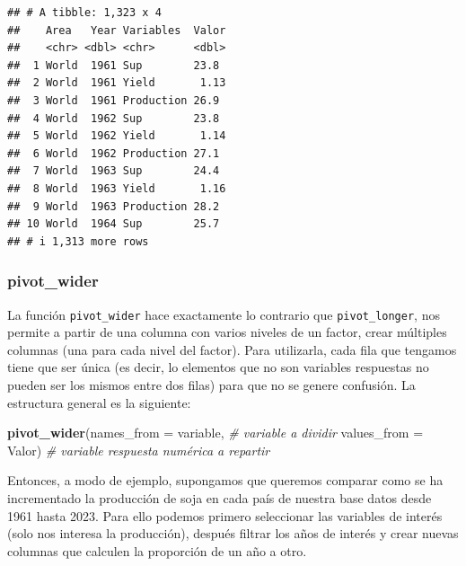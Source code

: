 \documentclass[
]{article}
\newenvironment{Shaded}{\begin{snugshade}}{\end{snugshade}}
\newcommand{\AttributeTok}[1]{\textcolor[rgb]{0.13,0.29,0.53}{#1}}
\newcommand{\CommentTok}[1]{\textcolor[rgb]{0.56,0.35,0.01}{\textit{#1}}}
\newcommand{\FunctionTok}[1]{\textcolor[rgb]{0.13,0.29,0.53}{\textbf{#1}}}
\newcommand{\NormalTok}[1]{#1}
\begin{document}
\begin{verbatim}
## # A tibble: 1,323 x 4
##    Area   Year Variables  Valor
##    <chr> <dbl> <chr>      <dbl>
##  1 World  1961 Sup        23.8 
##  2 World  1961 Yield       1.13
##  3 World  1961 Production 26.9 
##  4 World  1962 Sup        23.8 
##  5 World  1962 Yield       1.14
##  6 World  1962 Production 27.1 
##  7 World  1963 Sup        24.4 
##  8 World  1963 Yield       1.16
##  9 World  1963 Production 28.2 
## 10 World  1964 Sup        25.7 
## # i 1,313 more rows
\end{verbatim}

\subsubsection{pivot\_wider}\label{pivot_wider}

La función \texttt{pivot\_wider} hace exactamente lo contrario que
\texttt{pivot\_longer}, nos permite a partir de una columna con varios
niveles de un factor, crear múltiples columnas (una para cada nivel del
factor). Para utilizarla, cada fila que tengamos tiene que ser única (es
decir, lo elementos que no son variables respuestas no pueden ser los
mismos entre dos filas) para que no se genere confusión. La estructura
general es la siguiente:

\begin{Shaded}
\begin{Highlighting}[]
\FunctionTok{pivot\_wider}\NormalTok{(}\AttributeTok{names\_from =}\NormalTok{ variable, }\CommentTok{\# variable a dividir}
       \AttributeTok{values\_from =}\NormalTok{ Valor) }\CommentTok{\# variable respuesta numérica a repartir}
\end{Highlighting}
\end{Shaded}

Entonces, a modo de ejemplo, supongamos que queremos comparar como se ha
incrementado la producción de soja en cada país de nuestra base datos
desde 1961 hasta 2023. Para ello podemos primero seleccionar las
variables de interés (solo nos interesa la producción), después filtrar
los años de interés y crear nuevas columnas que calculen la proporción
de un año a otro.
\end{document}
